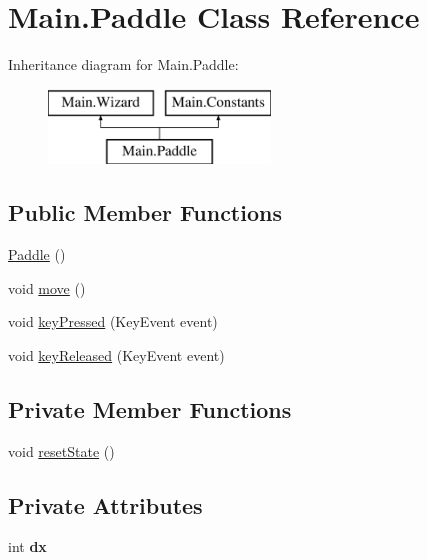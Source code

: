 \hypertarget{class_main_1_1_paddle}{}\section{Main.\+Paddle Class Reference}
\label{class_main_1_1_paddle}
Inheritance diagram for Main.\+Paddle\+:\begin{figure}[H]
\begin{center}
\leavevmode
\includegraphics[height=2.000000cm]{class_main_1_1_paddle}
\end{center}
\end{figure}
\subsection*{Public Member Functions}
\begin{DoxyCompactItemize}
\item 
\hyperlink{class_main_1_1_paddle_a06370cc44c3277525cc7f276bfc1d601}{Paddle} ()
\item 
void \hyperlink{class_main_1_1_paddle_ade5930feef33924d190242dfd90e5bc9}{move} ()
\item 
void \hyperlink{class_main_1_1_paddle_adfc1e29e1cdd3df6b4caf75f99471773}{key\+Pressed} (Key\+Event event)
\item 
void \hyperlink{class_main_1_1_paddle_ace7a033051fd52aa4e59f53d9a109be4}{key\+Released} (Key\+Event event)
\end{DoxyCompactItemize}
\subsection*{Private Member Functions}
\begin{DoxyCompactItemize}
\item 
void \hyperlink{class_main_1_1_paddle_a5d6b38c5dc37a6b3f22c64521daf8e99}{reset\+State} ()
\end{DoxyCompactItemize}
\subsection*{Private Attributes}
\begin{DoxyCompactItemize}
\item 
int {\bfseries dx}\hypertarget{class_main_1_1_paddle_af47d4ee4b9d59a39273cc3ec9c8c5a16}{}\label{class_main_1_1_paddle_af47d4ee4b9d59a39273cc3ec9c8c5a16}

\end{DoxyCompactItemize}

